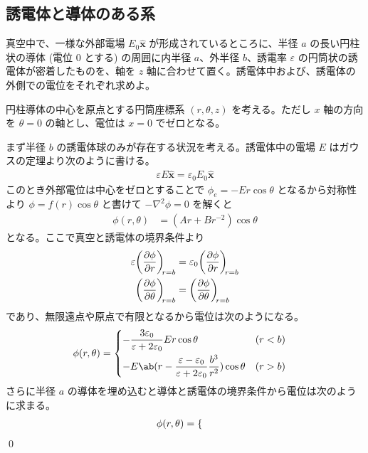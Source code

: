 \documentclass[uplatex,dvipdfmx,a4paper,11pt]{jlreq}
\makeatletter
\newcommand{\laplacian}{\nabla^2}
\numberwithin{equation}{section}
\theoremstyle{definition}
\renewenvironment{proof}[1][\proofname]{\par
  \normalfont
  \topsep6\p@\@plus6\p@ \trivlist
  \item[\hskip\labelsep{\bfseries #1}\@addpunct{\bfseries}]\ignorespaces\quad\par
}{%
  \qed\endtrivlist\@endpefalse
}
\renewcommand\proofname{証明}
\makeatother
\begin{document}
\subsection{誘電体と導体のある系}
\begin{problem}
真空中で、一様な外部電場 $E_0\hat{\bm{x}}$ が形成されているところに、半径 $a$ の長い円柱状の導体 (電位 $0$ とする) の周囲に内半径 $a$、外半径 $b$、誘電率 $\varepsilon$ の円筒状の誘電体が密着したものを、軸を $z$ 軸に合わせて置く。誘電体中および、誘電体の外側での電位をそれぞれ求めよ。
\end{problem}
\begin{proof}
  円柱導体の中心を原点とする円筒座標系 $(r, \theta, z)$ を考える。ただし $x$ 軸の方向を $\theta = 0$ の軸とし、電位は $x = 0$ でゼロとなる。

  まず半径 $b$ の誘電体球のみが存在する状況を考える。誘電体中の電場 $E$ はガウスの定理より次のように書ける。
  \begin{align}
    \varepsilon E\hat{\bm{x}} = \varepsilon_0E_0\hat{\bm{x}}
  \end{align}
  このとき外部電位は中心をゼロとすることで $\phi_e = -Er\cos\theta$ となるから対称性より $\phi = f(r)\cos\theta$ と書けて $-\laplacian\phi = 0$ を解くと
  \begin{align}
    \phi(r, \theta) & = (Ar + Br^{-2})\cos\theta
  \end{align}
  となる。ここで真空と誘電体の境界条件より
  \begin{align}
    \varepsilon\diffp{\phi}{r}[r=b] & = \varepsilon_0\diffp{\phi}{r}[r=b] \\
    \diffp{\phi}{\theta}[r=b]       & = \diffp{\phi}{\theta}[r=b]
  \end{align}
  であり、無限遠点や原点で有限となるから電位は次のようになる。
  \begin{align}
    \phi(r, \theta) & = \begin{dcases}
                          -\frac{3\varepsilon_0}{\varepsilon + 2\varepsilon_0}Er\cos\theta                                     & (r < b) \\
                          -E\ab(r - \frac{\varepsilon - \varepsilon_0}{\varepsilon + 2\varepsilon_0}\frac{b^3}{r^2})\cos\theta & (r > b) \\
                        \end{dcases}
  \end{align}
  さらに半径 $a$ の導体を埋め込むと導体と誘電体の境界条件から電位は次のように求まる。
  \begin{align}
    \phi(r, \theta) & = \begin{dcases}

\end{dcases}
\end{align}
\end{proof}
\end{document}
